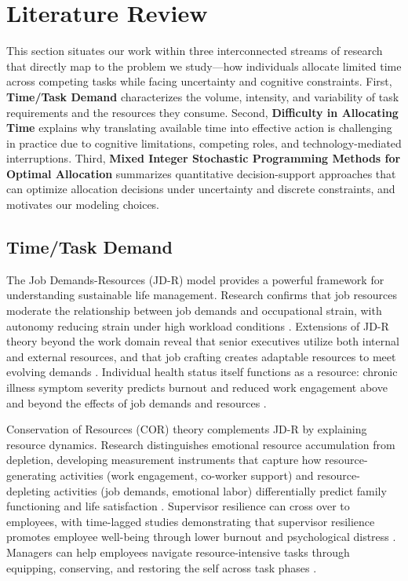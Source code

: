 \section{Literature Review}\label{sec:literature}

This section situates our work within three interconnected streams of research that directly map to the problem we study---how individuals allocate limited time across competing tasks while facing uncertainty and cognitive constraints. First, \textbf{Time/Task Demand} characterizes the volume, intensity, and variability of task requirements and the resources they consume. Second, \textbf{Difficulty in Allocating Time} explains why translating available time into effective action is challenging in practice due to cognitive limitations, competing roles, and technology-mediated interruptions. Third, \textbf{Mixed Integer Stochastic Programming Methods for Optimal Allocation} summarizes quantitative decision-support approaches that can optimize allocation decisions under uncertainty and discrete constraints, and motivates our modeling choices.



\subsection{Time/Task Demand}

The Job Demands-Resources (JD-R) model provides a powerful framework for understanding sustainable life management. Research confirms that job resources moderate the relationship between job demands and occupational strain, with autonomy reducing strain under high workload conditions \citep{ghanayem_occupational_2020}. Extensions of JD-R theory beyond the work domain reveal that senior executives utilize both internal and external resources, and that job crafting creates adaptable resources to meet evolving demands \citep{duan_extending_2024}. Individual health status itself functions as a resource: chronic illness symptom severity predicts burnout and reduced work engagement above and beyond the effects of job demands and resources \citep{cook_individual_2024}.

Conservation of Resources (COR) theory complements JD-R by explaining resource dynamics. Research distinguishes emotional resource accumulation from depletion, developing measurement instruments that capture how resource-generating activities (work engagement, co-worker support) and resource-depleting activities (job demands, emotional labor) differentially predict family functioning and life satisfaction \citep{ilies_emotional_2020}. Supervisor resilience can cross over to employees, with time-lagged studies demonstrating that supervisor resilience promotes employee well-being through lower burnout and psychological distress \citep{brady_supervisor_2025}. Managers can help employees navigate resource-intensive tasks through equipping, conserving, and restoring the self across task phases \citep{molinsky_how_2023}.

